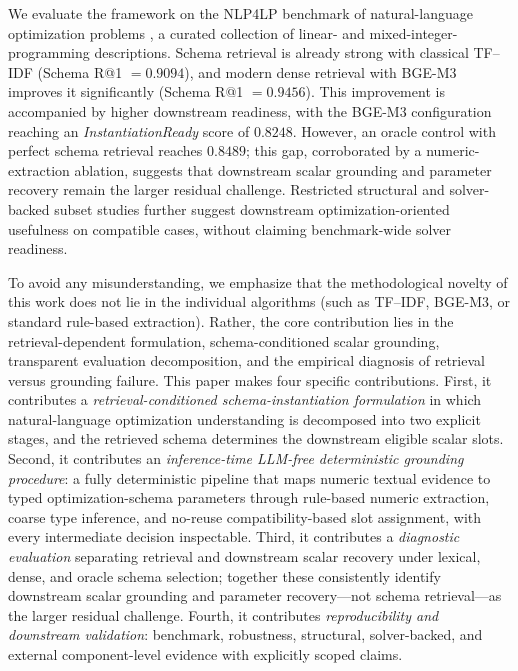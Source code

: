\documentclass[3p]{elsarticle}
\begin{document}
We evaluate the framework on the \textsc{NLP4LP} benchmark of natural-language optimization problems \cite{nlp4lp_dataset,ahmaditeshnizi2024optimus_icml}, a curated collection of linear- and mixed-integer-programming descriptions. Schema retrieval is already strong with classical TF--IDF (Schema R@1 $=0.9094$), and modern dense retrieval with BGE-M3 improves it significantly (Schema R@1 $=0.9456$). This improvement is accompanied by higher downstream readiness, with the BGE-M3 configuration reaching an \textit{InstantiationReady} score of $0.8248$. However, an oracle control with perfect schema retrieval reaches $0.8489$; this gap, corroborated by a numeric-extraction ablation, suggests that downstream scalar grounding and parameter recovery remain the larger residual challenge. Restricted structural and solver-backed subset studies further suggest downstream optimization-oriented usefulness on compatible cases, without claiming benchmark-wide solver readiness.

To avoid any misunderstanding, we emphasize that the methodological novelty of this work does not lie in the individual algorithms (such as TF--IDF, BGE-M3, or standard rule-based extraction). Rather, the core contribution lies in the retrieval-dependent formulation, schema-conditioned scalar grounding, transparent evaluation decomposition, and the empirical diagnosis of retrieval versus grounding failure. This paper makes four specific contributions.
\label{subsec:intro_contributions}
First, it contributes a \emph{retrieval-conditioned schema-instantiation formulation} in which natural-language optimization understanding is decomposed into two explicit stages, and the retrieved schema determines the downstream eligible scalar slots. Second, it contributes an \emph{inference-time LLM-free deterministic grounding procedure}: a fully deterministic pipeline that maps numeric textual evidence to typed optimization-schema parameters through rule-based numeric extraction, coarse type inference, and no-reuse compatibility-based slot assignment, with every intermediate decision inspectable. Third, it contributes a \emph{diagnostic evaluation} separating retrieval and downstream scalar recovery under lexical, dense, and oracle schema selection; together these consistently identify downstream scalar grounding and parameter recovery---not schema retrieval---as the larger residual challenge. Fourth, it contributes \emph{reproducibility and downstream validation}: benchmark, robustness, structural, solver-backed, and external component-level evidence with explicitly scoped claims.
\end{document}
